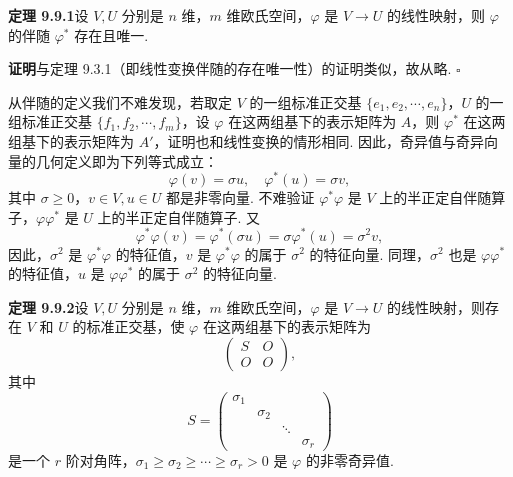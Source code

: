 \documentclass[UTF8,12pt,a4paper,fontset=fandol]{ctexart}
\begin{document}
\noindent\textbf{定理 9.9.1}\quad 设 $V,U$ 分别是 $n$ 维，$m$ 维欧氏空间，$\varphi$ 是 $V\to U$ 的线性映射，则 $\varphi$ 的伴随 $\varphi^*$ 存在且唯一.

\noindent\textbf{证明}\quad 与定理 9.3.1（即线性变换伴随的存在唯一性）的证明类似，故从略. $\square$

从伴随的定义我们不难发现，若取定 $V$ 的一组标准正交基 $\{e_1,e_2,\cdots,e_n\}$，$U$ 的一组标准正交基 $\{f_1,f_2,\cdots,f_m\}$，设 $\varphi$ 在这两组基下的表示矩阵为 $A$，则 $\varphi^*$ 在这两组基下的表示矩阵为 $A'$，证明也和线性变换的情形相同. 因此，奇异值与奇异向量的几何定义即为下列等式成立：
\[
  \varphi(v)=\sigma u,\quad \varphi^*(u)=\sigma v,
\]
其中 $\sigma\ge0$，$v\in V,u\in U$ 都是非零向量. 不难验证 $\varphi^*\varphi$ 是 $V$ 上的半正定自伴随算子，$\varphi\varphi^*$ 是 $U$ 上的半正定自伴随算子. 又
\[
  \varphi^*\varphi(v)=\varphi^*(\sigma u)=\sigma\varphi^*(u)=\sigma^2v,
\]
因此，$\sigma^2$ 是 $\varphi^*\varphi$ 的特征值，$v$ 是 $\varphi^*\varphi$ 的属于 $\sigma^2$ 的特征向量. 同理，$\sigma^2$ 也是 $\varphi\varphi^*$ 的特征值，$u$ 是 $\varphi\varphi^*$ 的属于 $\sigma^2$ 的特征向量.

\noindent\textbf{定理 9.9.2}\quad 设 $V,U$ 分别是 $n$ 维，$m$ 维欧氏空间，$\varphi$ 是 $V\to U$ 的线性映射，则存在 $V$ 和 $U$ 的标准正交基，使 $\varphi$ 在这两组基下的表示矩阵为
\[
  \left(\begin{array}{cc}
    S & O\\
    O & O
  \end{array}\right),
\]
其中
\[
  S=
  \left(\begin{array}{cccc}
    \sigma_1 & & &\\
    & \sigma_2 & &\\
    & & \ddots &\\
    & & & \sigma_r
  \end{array}\right)
\]
是一个 $r$ 阶对角阵，$\sigma_1\ge\sigma_2\ge\cdots\ge\sigma_r>0$ 是 $\varphi$ 的非零奇异值.
\end{document}
